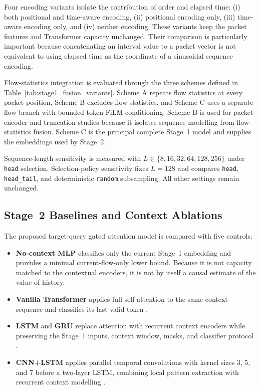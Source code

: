 \documentclass[11pt,fleqn]{report}
\begin{document}
Four encoding variants isolate the contribution of order and elapsed time: (i) both positional and time-aware encoding, (ii) positional encoding only, (iii) time-aware encoding only, and (iv) neither encoding. These variants keep the packet features and Transformer capacity unchanged. Their comparison is particularly important because concatenating an interval value to a packet vector is not equivalent to using elapsed time as the coordinate of a sinusoidal sequence encoding.

Flow-statistics integration is evaluated through the three schemes defined in Table~\ref{tab:stage1_fusion_variants}. Scheme A repeats flow statistics at every packet position, Scheme B excludes flow statistics, and Scheme C uses a separate flow branch with bounded token-FiLM conditioning. Scheme B is used for packet-encoder and truncation studies because it isolates sequence modelling from flow-statistics fusion. Scheme C is the principal complete Stage~1 model and supplies the embeddings used by Stage~2.

Sequence-length sensitivity is measured with $L\in\{8,16,32,64,128,256\}$ under \texttt{head} selection. Selection-policy sensitivity fixes $L=128$ and compares \texttt{head}, \texttt{head\_tail}, and deterministic \texttt{random} subsampling. All other settings remain unchanged.

\subsection{Stage~2 Baselines and Context Ablations}
\label{subsubsec:stage2_baseline_protocol}

The proposed target-query gated attention model is compared with five controls:

\begin{itemize}[leftmargin=*]
    \item \textbf{No-context MLP} classifies only the current Stage~1 embedding and provides a minimal current-flow-only lower bound. Because it is not capacity matched to the contextual encoders, it is not by itself a causal estimate of the value of history.

    \item \textbf{Vanilla Transformer} applies full self-attention to the same context sequence and classifies its last valid token \cite{Vaswani2017}.

    \item \textbf{LSTM} and \textbf{GRU} replace attention with recurrent context encoders while preserving the Stage~1 inputs, context window, masks, and classifier protocol \cite{Hochreiter1997LSTM,Cho2014GRU}.

    \item \textbf{CNN+LSTM} applies parallel temporal convolutions with kernel sizes 3, 5, and 7 before a two-layer LSTM, combining local pattern extraction with recurrent context modelling \cite{Kim2014CNN,Hochreiter1997LSTM}.
\end{itemize}
\end{document}
